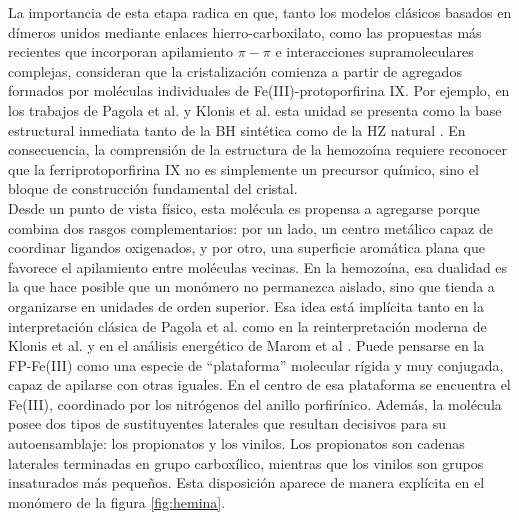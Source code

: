 \documentclass[12pt,letterpaper,oneside]{report}
\begin{document}
La importancia de esta etapa radica en que, tanto los modelos clásicos basados en dímeros unidos mediante enlaces hierro-carboxilato, como las propuestas más recientes que incorporan apilamiento $\pi-\pi$ e interacciones supramoleculares complejas, consideran que la cristalización comienza a partir de agregados formados por moléculas individuales de Fe(III)-protoporfirina IX. Por ejemplo, en los trabajos de Pagola et al. y Klonis et al. esta unidad se presenta como la base estructural inmediata tanto de la BH sintética como de la HZ natural \cite{PagolaSilvina2000, Klonis2010}. En consecuencia, la comprensión de la estructura de la hemozoína requiere reconocer que la ferriprotoporfirina IX no es simplemente un precursor químico, sino el bloque de construcción fundamental del cristal.\\



Desde un punto de vista físico, esta molécula es propensa a agregarse porque combina dos rasgos complementarios: por un lado, un centro metálico capaz de coordinar ligandos oxigenados, y por otro, una superficie aromática plana que favorece el apilamiento entre moléculas vecinas. En la hemozoína, esa dualidad es la que hace posible que un monómero no permanezca aislado, sino que tienda a organizarse en unidades de orden superior. Esa idea está implícita tanto en la interpretación clásica de Pagola et al. como en la reinterpretación moderna de Klonis et al. y en el análisis energético de Marom et al \cite{ Marom2011}.
Puede pensarse en la FP-Fe(III) como una especie de “plataforma” molecular rígida y muy conjugada, capaz de apilarse con otras iguales. En el centro de esa plataforma se encuentra el Fe(III), coordinado por los nitrógenos del anillo porfirínico. Además, la molécula posee dos tipos de sustituyentes laterales que resultan decisivos para su autoensamblaje: los propionatos y los vinilos. Los propionatos son cadenas laterales terminadas en grupo carboxílico, mientras que los vinilos son grupos insaturados más pequeños. Esta disposición aparece de manera explícita en el monómero de la figura \ref{fig:hemina}.\\
\end{document}
